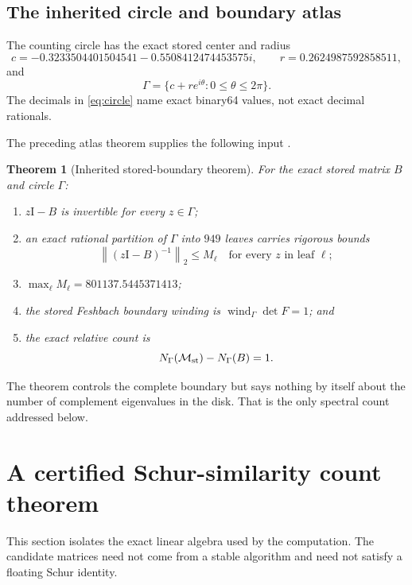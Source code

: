 \documentclass[11pt]{article}
\newtheorem{theorem}{Theorem}[section]
\theoremstyle{definition}
\theoremstyle{remark}
\newcommand{\Id}{\mathrm I}
\newcommand{\norm}[1]{\left\lVert#1\right\rVert}
\newcommand{\wind}{\operatorname{wind}}
\newcommand{\Maug}{\mathcal M_{\rm st}}
\begin{document}
\subsection{The inherited circle and boundary atlas}

The counting circle has the exact stored center and radius
\begin{equation}
 c=-0.3233504401504541-0.5508412474453575i,
 \qquad
 r=0.2624987592858511,
 \label{eq:circle}
\end{equation}
and
\[
 \Gamma=\{c+r e^{i\theta}:0\leq\theta\leq2\pi\}.
\]
The decimals in \cref{eq:circle} name exact binary64 values, not exact
decimal rationals.

The preceding atlas theorem supplies the following input
\citep{WangAtlas2026}.

\begin{theorem}[Inherited stored-boundary theorem]
\label{thm:inherited}
For the exact stored matrix \(B\) and circle \(\Gamma\):
\begin{enumerate}
 \item \(z\Id-B\) is invertible for every \(z\in\Gamma\);
 \item an exact rational partition of \(\Gamma\) into \(949\) leaves carries
       rigorous bounds
       \[
        \norm{(z\Id-B)^{-1}}_2\leq M_\ell
        \quad\text{for every \(z\) in leaf \(\ell\)};
       \]
 \item \(\max_\ell M_\ell=801137.5445371413\);
 \item the stored Feshbach boundary winding is
       \(\wind_\Gamma\det F=1\); and
 \item the exact relative count is
       \[
        N_\Gamma(\Maug)-N_\Gamma(B)=1.
       \]
\end{enumerate}
\end{theorem}

The theorem controls the complete boundary but says nothing by itself about
the number of complement eigenvalues in the disk.  That is the only
spectral count addressed below.

\section{A certified Schur-similarity count theorem}
\label{sec:abstract-certificate}

This section isolates the exact linear algebra used by the computation.
The candidate matrices need not come from a stable algorithm and need not
satisfy a floating Schur identity.
\end{document}
